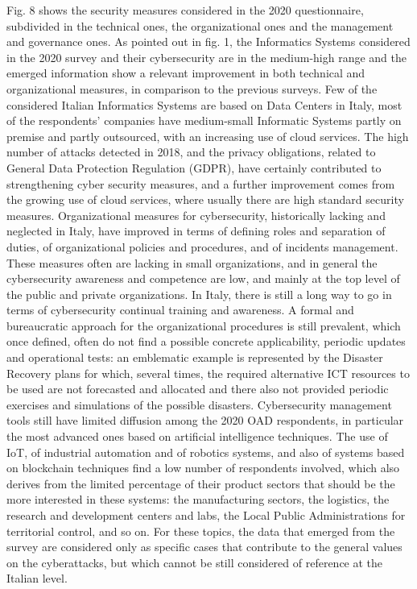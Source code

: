 \documentclass{easychair}
\begin{document}
Fig. 8 shows the security measures considered in the 2020 questionnaire, subdivided in the technical ones, the organizational ones and  the management and governance ones. 
As pointed out in fig. 1, the Informatics Systems considered in the 2020 survey and their cybersecurity  are in the medium-high range and the emerged information show a relevant 
improvement in both technical and organizational measures, in comparison to the previous surveys. Few of the considered Italian Informatics Systems are based on Data Centers in 
Italy, most of the respondents’ companies have medium-small Informatic Systems partly on premise and partly outsourced, with an increasing use of cloud services.
The high number of attacks detected in 2018, and the privacy obligations, related to General Data Protection Regulation (GDPR), have certainly contributed to strengthening cyber security measures, and a further improvement 
comes from the growing use of cloud services, where usually there are high standard security measures. Organizational measures for cybersecurity, historically lacking and neglected
in Italy, have improved in terms of defining roles and separation of duties, of organizational policies and procedures, and of incidents management. These measures often are lacking
in small organizations, and in general the cybersecurity awareness and competence are low, and mainly at the top level of the public and private organizations. In Italy, there is 
still a long way to go in terms of cybersecurity continual training and awareness. A formal and bureaucratic approach for the organizational procedures is still prevalent, which 
once defined, often do not find a possible concrete applicability, periodic updates and operational tests: an emblematic example is represented by the Disaster Recovery plans for 
which, several times, the required alternative ICT resources to be used are not forecasted and allocated and there also not provided periodic exercises and simulations of the 
possible disasters. Cybersecurity management tools still have limited diffusion among the 2020 OAD respondents, in particular the most advanced ones based on artificial intelligence
techniques. The use of IoT, of industrial automation and of robotics systems, and also of systems based on blockchain techniques find a low number of respondents involved, which 
also derives from the limited percentage of their product sectors that should be the more interested in these systems: the manufacturing sectors, the logistics, the research and 
development centers and labs, the Local Public Administrations for territorial control, and so on. For these topics, the data that emerged from the survey are considered only as 
specific cases that contribute to the general values on the cyberattacks, but which cannot be still considered of reference at the Italian level.
\end{document}
